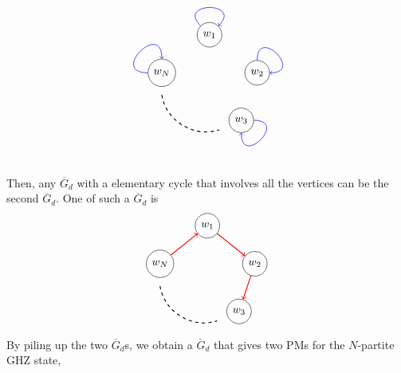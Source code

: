 \documentclass[a4paper,twocolumn,8pt,accepted=2021-12-15]{quantumarticle}
\def\dc{{\overline{G}_d }}
\begin{document}
	\[\begin{tikzpicture}[baseline={([yshift=-.5ex]current bounding box.center)}]
		\node[circle,draw] (a) at (6,2.7) {$w_1$};
		\node[circle,draw] (b) at (7.5,1.5) {$w_2$};		
		\node[circle,draw] (c) at (7,0) {$w_3$};
		\node[circle,draw] (e) at (4.5,1.5) {$w_N$};		
		\path[every loop/.style={min distance=10mm,in=45,out=135,looseness=5,color=blue,->},line width = 0.5pt] (a) edge [loop above]   (a);
		\path[every loop/.style={min distance=10mm,in=0,out=90,looseness=5,color=blue},line width = 0.5pt,->] (b) edge [loop above] (b);
		\path[every loop/.style={min distance=10mm,in=270,out=0,looseness=5,color=blue ,->},line width = 0.5pt] (c) edge [loop above]  (c);
		\path[every loop/.style={min distance=10mm,in=90,out=180,looseness=5,color=blue ,->},line width = 0.5pt] (e) edge [loop above]  (e);	
		\draw[thick, dashed] (4.5,0.8) to[bend right=50] (6.3,-.3);				
	\end{tikzpicture}\] 
	Then, any $\dc$ with a elementary cycle that involves all the vertices can be the second $\dc$. One of such a $\dc$ is  
	\[\begin{tikzpicture}[baseline={([yshift=-.5ex]current bounding box.center)}]
		\node[circle,draw] (a) at (6,2.7) {$w_1$};
		\node[circle,draw] (b) at (7.5,1.5) {$w_2$};		
		\node[circle,draw] (c) at (7,0) {$w_3$};
		
		\node[circle,draw] (e) at (4.5,1.5) {$w_N$};		
		\path[line width = 0.8pt,color=red,->] (a) edge (b);
		\path[line width = 0.8pt,color=red,->] (b) edge (c);
		\path[line width = 0.8pt,color=red,->] (e) edge (a);						
		\draw[thick, dashed] (4.5,0.8) to[bend right=50] (6.3,-.3);				
	\end{tikzpicture}\] 
	By piling up the two $\dc$s, we obtain a $\dc$ that gives two PMs for the $N$-partite GHZ state,
\end{document}
